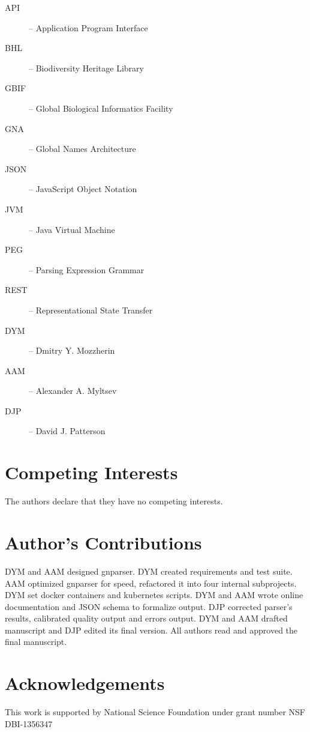 \documentclass{bmcart}
\begin{document}
\begin{description}
  \item[API] -- Application Program Interface
  \item[BHL] -- Biodiversity Heritage Library
  \item[GBIF] -- Global Biological Informatics Facility
  \item[GNA] -- Global Names Architecture
  \item[JSON] -- JavaScript Object Notation
  \item[JVM] -- Java Virtual Machine
  \item[PEG] -- Parsing Expression Grammar
  \item[REST] -- Representational State Transfer
  \item[DYM] -- Dmitry Y. Mozzherin
  \item[AAM] -- Alexander A. Myltsev
  \item[DJP] -- David J. Patterson
\end{description}

\section*{Competing Interests}

The authors declare that they have no competing interests.

\section*{Author's Contributions}

DYM and AAM designed gnparser. DYM created requirements and test suite. AAM
optimized gnparser for speed, refactored it into four internal subprojects.
DYM set docker containers and kubernetes scripts. DYM and AAM wrote online
documentation and JSON schema to formalize output. DJP corrected parser's
results, calibrated quality output and errors output. DYM and AAM drafted
manuscript and DJP edited its final version. All authors read and approved the
final manuscript.

\section*{Acknowledgements}

This work is supported by National Science Foundation under grant number NSF
DBI-1356347
\end{document}
